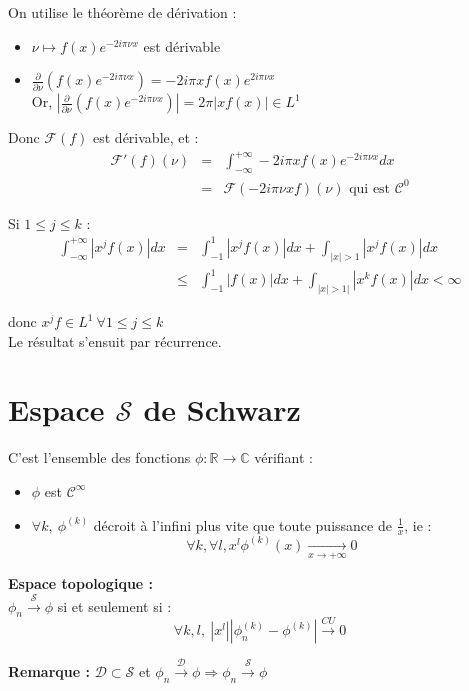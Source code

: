 \documentclass{article}
\begin{document}
\begin{dem}[de la démonstration 2]
On utilise le théorème de dérivation :
\begin{itemize}
\item $\nu \mapsto f(x)e^{-2i\pi\nu x}$ est dérivable
\item $\frac{\partial}{\partial \nu}(f(x)e^{-2i\pi\nu x}) = -2i\pi x f(x)e^{2i\pi\nu x}$ \\
Or, $\left| \frac{\partial}{\partial \nu}(f(x)e^{-2i\pi\nu x}) \right| = 2\pi |xf(x)| \in L^1$
\end{itemize}

\bigskip
Donc $\mathcal{F}(f)$ est dérivable, et :
\begin{eqnarray*}
\mathcal{F}'(f)(\nu)&=& \int_{-\infty}^{+\infty} -2i\pi xf(x) e^{-2i\pi\nu x} dx \\
	&=& \mathcal{F}(-2i\pi\nu xf)(\nu) \text{ qui est } \mathcal{C}^0
\end{eqnarray*}

Si $1\leq j\leq k$ : 
\begin{eqnarray*}
\int_{-\infty}^{+\infty} |x^j f(x)| dx &=& \int_{-1}^1 |x^jf(x)| dx + \int_{|x|>1} |x^jf(x)| dx \\
	&\leq& \int_{-1}^{1} |f(x)| dx + \int_{|x|>1|} |x^k f(x)| dx < \infty
\end{eqnarray*}

donc $x^jf\in L^1\ \forall 1\leq j\leq k$\\
Le résultat s'ensuit par récurrence.
\end{dem}

\section{Espace $\mathcal{S}$ de Schwarz}
C'est l'ensemble des fonctions $\phi : \mathbb{R}\to \mathbb{C}$ vérifiant : 
\begin{itemize}
\item $\phi$ est $\mathcal{C}^{\infty}$
\item $\forall k,\ \phi^{(k)}$ décroit à l'infini plus vite que toute puissance de $\frac{1}{x}$, ie : 
\[\forall k, \forall l, x^l\phi^{(k)}(x) \xrightarrow[x\to +\infty]{} 0\]
\end{itemize}

\textbf{Espace topologique : \\}
$\phi_n \xrightarrow{\mathcal{S}} \phi$ si et seulement si : 
\[\forall k,l,\ |x^l||\phi_n^{(k)}-\phi^{(k)}| \xrightarrow{CU} 0\]

\textbf{Remarque :} $\mathcal{D} \subset \mathcal{S}$ et $\phi_n \xrightarrow{\mathcal{D}} \phi \Rightarrow \phi_n \xrightarrow{\mathcal{S}} \phi$ 
\end{document}
